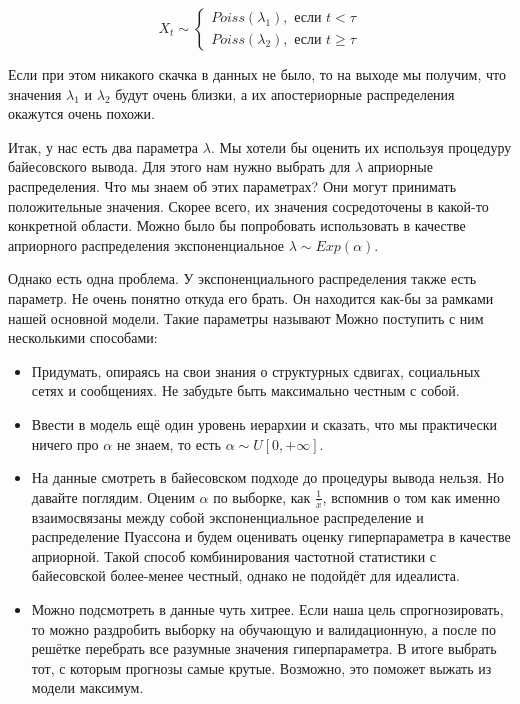 \begin{equation*}
X_t \sim \begin{cases}  Poiss(\lambda_1), \text{ если } t < \tau \\  Poiss(\lambda_2), \text{ если } t \ge \tau \end{cases}
\end{equation*}

Если при этом никакого скачка в данных не было, то на выходе мы получим, что значения $\lambda_1$ и $\lambda_2$ будут очень близки, а их апостериорные распределения окажутся очень похожи. 

Итак, у нас есть два параметра $\lambda$. Мы хотели бы оценить их используя процедуру байесовского вывода. Для этого нам нужно выбрать для $\lambda$ априорные распределения. Что мы знаем об этих параметрах? Они могут принимать положительные значения. Скорее всего, их значения сосредоточены в какой-то конкретной области. Можно было бы попробовать использовать в качестве априорного распределения экспоненциальное $\lambda \sim Exp(\alpha)$. 

Однако есть одна проблема. У экспоненциального распределения также есть параметр. Не очень понятно откуда его брать. Он находится как-бы за рамками нашей основной модели. Такие параметры называют   Можно поступить с ним несколькими способами: 

\begin{itemize}
\item Придумать, опираясь на свои знания о структурных сдвигах, социальных сетях и сообщениях. Не забудьте быть максимально честным с собой.
\item Ввести в модель ещё один уровень иерархии и сказать, что мы практически ничего про $\alpha$ не знаем, то есть  $\alpha \sim U[0, + \infty]$.
\item На данные смотреть в байесовском подходе до процедуры вывода нельзя. Но давайте поглядим. Оценим $\alpha$ по выборке, как $\frac{1}{\bar x}$, вспомнив о том как именно взаимосвязаны между собой экспоненциальное распределение и распределение Пуассона и будем оценивать оценку гиперпараметра в качестве априорной. Такой способ комбинирования частотной статистики с байесовской более-менее честный, однако не подойдёт для идеалиста. 
\item Можно подсмотреть в данные чуть хитрее. Если наша цель спрогнозировать, то можно раздробить выборку на обучающую и валидационную, а после по решётке перебрать все разумные значения гиперпараметра. В итоге выбрать тот, с которым прогнозы самые крутые. Возможно, это поможет выжать из модели максимум. 
\end{itemize}

